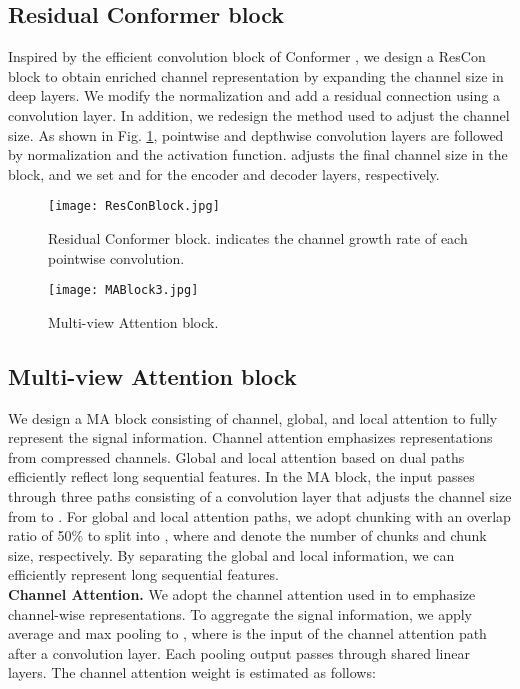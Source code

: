 \documentclass{article}
\begin{document}
\subsection{Residual Conformer block}
\label{sec:rescon}
Inspired by the efficient convolution block of Conformer \cite{gulati2020conformer}, we design a ResCon block to obtain enriched channel representation by expanding the channel size in deep layers. We modify the normalization and add a residual connection using a convolution layer. In addition, we redesign the method used to adjust the channel size. As shown in Fig. \ref{fig:rescon}, pointwise and depthwise convolution layers are followed by normalization and the activation function.  adjusts the final channel size in the block, and we set  and  for the encoder and decoder layers, respectively. 
\begin{figure}[h]
\centerline{\texttt{[image: ResConBlock.jpg]}}
\caption{Residual Conformer block.  indicates the channel growth rate of each pointwise convolution.}
\label{fig:rescon}
\end{figure}
\begin{figure}[h]
\centerline{\texttt{[image: MABlock3.jpg]}}
\caption{Multi-view Attention block.}
\label{fig:mablock}
\end{figure}
\subsection{Multi-view Attention block}
\label{sec:attention}
We design a MA block consisting of channel, global, and local attention to fully represent the signal information. Channel attention emphasizes representations from compressed channels. Global and local attention based on dual paths efficiently reflect long sequential features. In the MA block, the input passes through three paths consisting of a convolution layer that adjusts the channel size from  to . For global and local attention paths, we adopt chunking with an overlap ratio of 50\% to split  into , where  and  denote the number of chunks and chunk size, respectively. By separating the global and local information, we can efficiently represent long sequential features. \\
\noindent \textbf{Channel Attention.} We adopt the channel attention used in \cite{woo2018cbam} to emphasize channel-wise representations. To aggregate the signal information, we apply average and max pooling to , where  is the input of the channel attention path after a convolution layer. Each pooling output passes through shared linear layers. The channel attention weight  is estimated as follows:
\end{document}
